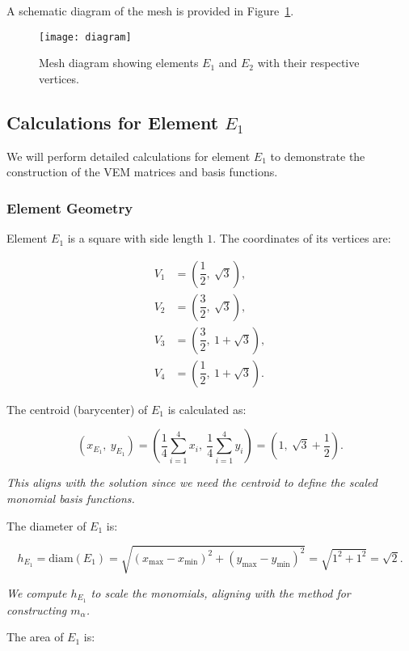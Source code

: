\documentclass[class=article, crop=false]{standalone}
\begin{document}
A schematic diagram of the mesh is provided in Figure~\ref{fig:mesh_diagram}.

\begin{figure}[h]
    \centering
    \texttt{[image: diagram]}
    \caption{Mesh diagram showing elements $E_1$ and $E_2$ with their respective vertices.}
    \label{fig:mesh_diagram}
\end{figure}

\subsection{Calculations for Element $E_1$}

We will perform detailed calculations for element $E_1$ to demonstrate the construction of the VEM matrices and basis functions.

\subsubsection{Element Geometry}

Element $E_1$ is a square with side length $1$. The coordinates of its vertices are:

\[
\begin{aligned}
V_1 &= \left( \dfrac{1}{2},\ \sqrt{3} \right), \\
V_2 &= \left( \dfrac{3}{2},\ \sqrt{3} \right), \\
V_3 &= \left( \dfrac{3}{2},\ 1 + \sqrt{3} \right), \\ 
V_4 &= \left( \dfrac{1}{2},\ 1 + \sqrt{3} \right).
\end{aligned}
\]

The centroid (barycenter) of $E_1$ is calculated as:

\[
(x_{E_1},\ y_{E_1}) = \left( \dfrac{1}{4} \sum_{i=1}^4 x_i,\ \dfrac{1}{4} \sum_{i=1}^4 y_i \right) = \left( 1,\ \sqrt{3} + \dfrac{1}{2} \right).
\]

\noindent
\textit{This aligns with the solution since we need the centroid to define the scaled monomial basis functions.}

The diameter of $E_1$ is:

\[
h_{E_1} = \text{diam}(E_1) = \sqrt{(x_{\max} - x_{\min})^2 + (y_{\max} - y_{\min})^2} = \sqrt{1^2 + 1^2} = \sqrt{2}.
\]

\noindent
\textit{We compute $h_{E_1}$ to scale the monomials, aligning with the method for constructing $m_\alpha$.}

The area of $E_1$ is:
\end{document}

